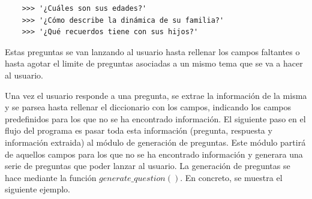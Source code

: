 \begin{verbatim}
	>>>	'¿Cuáles son sus edades?'
	>>> '¿Cómo describe la dinámica de su familia?'
	>>> '¿Qué recuerdos tiene con sus hijos?'
\end{verbatim}

Estas preguntas se van lanzando al usuario hasta rellenar los campos faltantes o hasta agotar el limite de preguntas asociadas a un mismo tema que se va a hacer al usuario.

Una vez el usuario responde a una pregunta, se extrae la información de la misma y se parsea hasta rellenar el diccionario con los campos, indicando los campos predefinidos para los que no se ha encontrado información. El siguiente paso en el flujo del programa es pasar toda esta información (pregunta, respuesta y información extraida) al módulo de generación de preguntas. Este módulo partirá de aquellos campos para los que no se ha encontrado información y generara una serie de preguntas que poder lanzar al usuario. La generación de preguntas se hace mediante la función $generate\_question()$. En concreto, se muestra el siguiente ejemplo. 

